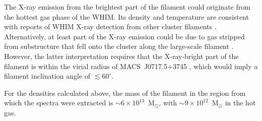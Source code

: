 The X-ray emission from the brightest part of the filament could originate from the hottest gas phase of the WHIM. Its density and temperature are consistent with reports of WHIM X-ray detection from other cluster filaments \citep[e.g.,][]{Werner2008, Eckert2015}. Alternatively, at least part of the X-ray emission could be due to gas stripped from substructure that fell onto the cluster along the large-scale filament \citep[similarly to what is seen in A85;][]{Ichinohe2015}. However, the latter interpretation requires that the X-ray-bright part of the filament is within the virial radius of MACS~J0717.5+3745 \citep[$r_{\rm 138} = 2.5$~Mpc;][]{Medezinski2013}, which would imply a filament inclination angle of $\lesssim 60^\circ$. 

For the densities calculated above, the mass of the filament in the region from which the spectra were extracted is $\sim 6\times 10^{13}$~M$_\odot$, with $\sim 9\times 10^{12}$~M$_\odot$ in the hot gas. 

